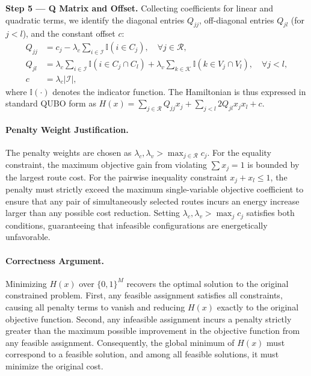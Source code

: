 \documentclass[12pt]{article}
\begin{document}
\textbf{Step 5 --- Q Matrix and Offset.}
Collecting coefficients for linear and quadratic terms, we identify the diagonal entries $Q_{jj}$, off-diagonal entries $Q_{jl}$ (for $j < l$), and the constant offset $c$:
\begin{align}
  Q_{jj} &= c_j - \lambda_c \sum_{i \in \mathcal{I}} \mathbb{I}(i \in C_j), \quad \forall j \in \mathcal{R}, \\
  Q_{jl} &= \lambda_c \sum_{i \in \mathcal{I}} \mathbb{I}(i \in C_j \cap C_l) + \lambda_v \sum_{k \in \mathcal{K}} \mathbb{I}(k \in V_j \cap V_l), \quad \forall j < l, \\
  c &= \lambda_c |\mathcal{I}|,
\end{align}
where $\mathbb{I}(\cdot)$ denotes the indicator function. The Hamiltonian is thus expressed in standard QUBO form as $H(x) = \sum_{j \in \mathcal{R}} Q_{jj} x_j + \sum_{j < l} 2 Q_{jl} x_j x_l + c$.

\paragraph{Penalty Weight Justification.}
The penalty weights are chosen as $\lambda_c, \lambda_v > \max_{j \in \mathcal{R}} c_j$. For the equality constraint, the maximum objective gain from violating $\sum x_j = 1$ is bounded by the largest route cost. For the pairwise inequality constraint $x_j + x_l \le 1$, the penalty must strictly exceed the maximum single-variable objective coefficient to ensure that any pair of simultaneously selected routes incurs an energy increase larger than any possible cost reduction. Setting $\lambda_c, \lambda_v > \max_j c_j$ satisfies both conditions, guaranteeing that infeasible configurations are energetically unfavorable.

\paragraph{Correctness Argument.}
Minimizing $H(x)$ over $\{0, 1\}^M$ recovers the optimal solution to the original constrained problem. First, any feasible assignment satisfies all constraints, causing all penalty terms to vanish and reducing $H(x)$ exactly to the original objective function. Second, any infeasible assignment incurs a penalty strictly greater than the maximum possible improvement in the objective function from any feasible assignment. Consequently, the global minimum of $H(x)$ must correspond to a feasible solution, and among all feasible solutions, it must minimize the original cost.
\end{document}
